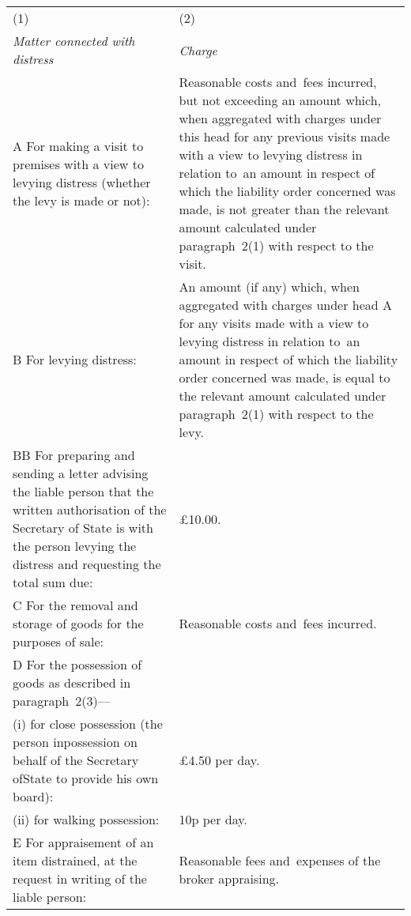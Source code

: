 \documentclass[12pt,a4paper]{article}
\begin{document}
{\noindent\footnotesize
\begin{longtable}{p{183pt}p{183pt}}
\hline
(1)&(2)\\
\itshape Matter connected with distress&\itshape Charge\\
\hline
\endhead
\hline
\endlastfoot
A {} For making a visit to premises with a view to levying distress (whether the levy is made or not):&
Reasonable costs and~fees incurred, but not exceeding an amount which, when aggregated with charges under this head for any previous visits made with a view to levying distress in relation to~an amount in respect of which the liability order concerned was made, is not greater than the relevant amount calculated under paragraph~2(1) with respect to the visit.\\
B {} For levying distress:&
An amount (if any) which, when aggregated with charges under head A for any visits made with a view to levying distress in relation to~an amount in respect of which the liability order concerned was made, is equal to the relevant amount calculated under paragraph~2(1) with respect to the levy.\\
BB {} For preparing and sending a letter advising the liable person that the written authorisation of the Secretary of State is with the person levying the distress and requesting the total sum due: & £10$.$00.\\
C {} For the removal and storage of goods for the purposes of sale:&
Reasonable costs and~fees incurred.\\
D {}  For the possession of goods as described in paragraph~2(3)—\\
\hspace{12pt}(i) for close possession (the person in\linebreak\hspace*{12pt}possession on behalf of the Secretary of\linebreak\hspace*{12pt}State to provide his own board):&
£4$.$50 per day.\\
\hspace{12pt}(ii) for walking possession:&
10p per day.\\ %
E {} For appraisement of an item distrained, at the request in writing of the liable person:&
Reasonable fees and~expenses of the broker appraising.\\

\end{longtable}}
\end{document}
